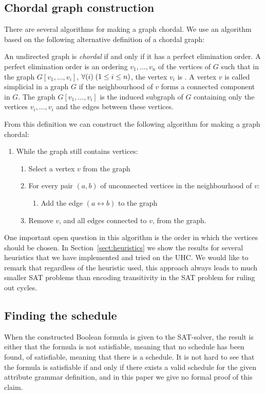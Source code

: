 \documentclass{llncs}
\newcommand{\sectref}[1]{Section~\ref{#1}}
\begin{document}
\subsection{Chordal graph construction} \label{sect:chordalconstruct}
There are several algorithms for making a graph chordal. We use an algorithm based on the following alternative definition of a chordal graph:

\begin{definition}
An undirected graph is \emph{chordal} if and only if it has a 
perfect elimination order. A perfect elimination order is an
ordering $v_1,\ldots,v_n$ of the vertices of $G$ such that in the graph
$G[v_1,\ldots,v_i]$, $\forall(i)\;(1 \leq i \leq n)$, the vertex $v_i$ is 
. A vertex $v$ is called simplicial in a graph $G$ if
the neighbourhood of $v$ forms a connected component in $G$.
The graph $G[v_1,\ldots,v_i]$ is the induced subgraph of $G$ containing
only the vertices $v_i,\ldots,v_i$ and the edges between these vertices.
\end{definition}

From this definition we can construct the following algorithm for making a graph chordal:
\begin{enumerate}
 \item While the graph still contains vertices:
 \begin{enumerate}
     \item Select a vertex $v$ from the graph
     \item For every pair $(a,b)$ of unconnected vertices in the neighbourhood
        of $v$: 
        \begin{enumerate}
            \item Add the edge $(a\leftrightarrow b)$ to the graph
        \end{enumerate}
     \item Remove $v$, and all edges connected to $v$, from the graph.
 \end{enumerate}
\end{enumerate}

One important open question in this algorithm is the order in which the vertices should be chosen. In \sectref{sect:heuristics} we show the results for several heuristics that we have implemented and tried on the UHC. We would like to remark that regardless of the heuristic used, this approach always leads to much smaller SAT problems than encoding transitivity in the SAT problem for ruling out cycles.

\subsection{Finding the schedule}
When the constructed Boolean formula is given to the SAT-solver, the result is either that the formula is not satisfiable, meaning that no schedule has been found, of satisfiable, meaning that there is a schedule. It is not hard to see that the formula is satisfiable if and only if there exists a valid schedule for the given attribute grammar definition, and in this paper we give no formal proof of this claim.
\end{document}
